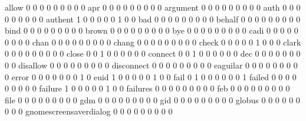 \documentclass[compress,8pt]{beamer}
\begin{document}
\begin{frame}
\begin{Schunk}
  allow                                      0   0   0   0   0   0   0   0   0
  apr                                        0   0   0   0   0   0   0   0   0
  argument                                   0   0   0   0   0   0   0   0   0
  auth                                       0   0   0   0   0   0   0   0   0
  authent                                    1   0   0   0   0   0   1   0   0
  bad                                        0   0   0   0   0   0   0   0   0
  behalf                                     0   0   0   0   0   0   0   0   0
  bind                                       0   0   0   0   0   0   0   0   0
  brown                                      0   0   0   0   0   0   0   0   0
  bye                                        0   0   0   0   0   0   0   0   0
  cadi                                       0   0   0   0   0   0   0   0   0
  chan                                       0   0   0   0   0   0   0   0   0
  chang                                      0   0   0   0   0   0   0   0   0
  check                                      0   0   0   0   0   1   0   0   0
  clark                                      0   0   0   0   0   0   0   0   0
  close                                      0   0   1   0   0   0   0   0   0
  connect                                    0   0   1   0   0   0   0   0   0
  dec                                        0   0   0   0   0   0   0   0   0
  disallow                                   0   0   0   0   0   0   0   0   0
  disconnect                                 0   0   0   0   0   0   0   0   0
  eaguilar                                   0   0   0   0   0   0   0   0   0
  error                                      0   0   0   0   0   0   0   1   0
  euid                                       1   0   0   0   0   0   1   0   0
  fail                                       0   1   0   0   0   0   0   0   1
  failed                                     0   0   0   0   0   0   0   0   0
  failure                                    1   0   0   0   0   0   1   0   0
  failures                                   0   0   0   0   0   0   0   0   0
  feb                                        0   0   0   0   0   0   0   0   0
  file                                       0   0   0   0   0   0   0   0   0
  gdm                                        0   0   0   0   0   0   0   0   0
  gid                                        0   0   0   0   0   0   0   0   0
  globus                                     0   0   0   0   0   0   0   0   0
  gnomescreensaverdialog                     0   0   0   0   0   0   0   0   0

\end{Schunk}
\end{frame}
\end{document}
